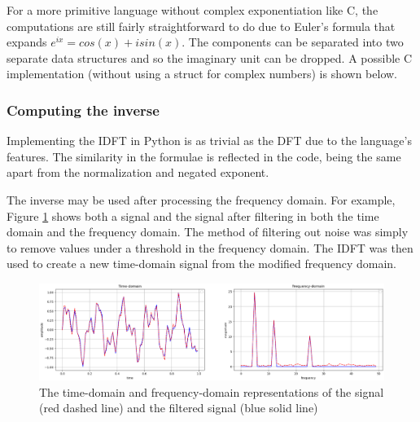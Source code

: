 

For a more primitive language without complex exponentiation like C, the computations are still fairly straightforward to do due to Euler's formula that expands $e^{ix} = cos(x) + isin(x)$. The components can be separated into two separate data structures and so the imaginary unit can be dropped. A possible C implementation (without using a struct for complex numbers) is shown below. 



\subsubsection{Computing the inverse}

Implementing the IDFT in Python is as trivial as the DFT due to the language's features. The similarity in the formulae is reflected in the code, being the same apart from the normalization and negated exponent. 



The inverse may be used after processing the frequency domain. For example,  Figure \ref{fig:DFT-IDFT} shows both a signal and the signal after filtering in both the time domain and the frequency domain. The method of filtering out noise was simply to remove values under a threshold in the frequency domain. The IDFT was then used to create a new time-domain signal from the modified frequency domain.

\begin{figure}[ht]
    \centering
    \includegraphics[width=\textwidth]{./images/filtered_signal.png}
    \caption{The time-domain and frequency-domain representations of the signal (red dashed line) and the filtered signal (blue solid line)\label{fig:DFT-IDFT}}
\end{figure}

